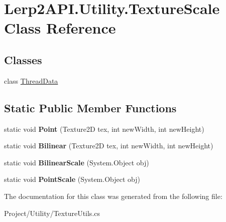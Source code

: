 \hypertarget{class_lerp2_a_p_i_1_1_utility_1_1_texture_scale}{}\section{Lerp2\+A\+P\+I.\+Utility.\+Texture\+Scale Class Reference}
\label{class_lerp2_a_p_i_1_1_utility_1_1_texture_scale}
\subsection*{Classes}
\begin{DoxyCompactItemize}
\item 
class \hyperlink{class_lerp2_a_p_i_1_1_utility_1_1_texture_scale_1_1_thread_data}{Thread\+Data}
\end{DoxyCompactItemize}
\subsection*{Static Public Member Functions}
\begin{DoxyCompactItemize}
\item 
\mbox{\label{class_lerp2_a_p_i_1_1_utility_1_1_texture_scale_ae1a7ff1fb6469b35ad24b4f15da9b75e}} 
static void {\bfseries Point} (Texture2D tex, int new\+Width, int new\+Height)
\item 
\mbox{\label{class_lerp2_a_p_i_1_1_utility_1_1_texture_scale_a569de17ba4a48d73610c712c4d97c2f6}} 
static void {\bfseries Bilinear} (Texture2D tex, int new\+Width, int new\+Height)
\item 
\mbox{\label{class_lerp2_a_p_i_1_1_utility_1_1_texture_scale_aee123ab57c9b3f31bd7d02e0773193ba}} 
static void {\bfseries Bilinear\+Scale} (System.\+Object obj)
\item 
\mbox{\label{class_lerp2_a_p_i_1_1_utility_1_1_texture_scale_ae076d34e049e9e4a7a035a4f73a1a633}} 
static void {\bfseries Point\+Scale} (System.\+Object obj)
\end{DoxyCompactItemize}


The documentation for this class was generated from the following file\+:\begin{DoxyCompactItemize}
\item 
Project/\+Utility/Texture\+Utils.\+cs\end{DoxyCompactItemize}
